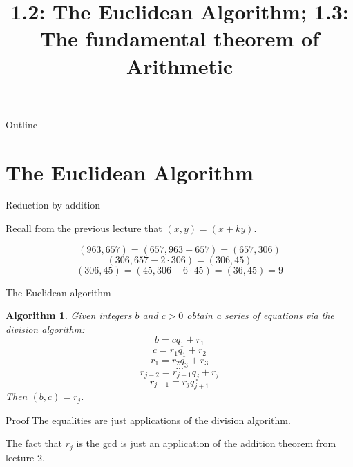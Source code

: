 \documentclass{beamer}
\title[Euclidean Algorithm] %
{1.2: The Euclidean Algorithm; 1.3: The fundamental theorem of
  Arithmetic}
\newtheorem{algorithm}[theorem]{Algorithm}
\begin{document}
\begin{frame}
  \titlepage
\end{frame}

\begin{frame}{Outline}
  \tableofcontents
\end{frame}




\section{The Euclidean Algorithm}

\begin{frame}{Reduction by addition}

  Recall from the previous lecture that $(x, y) = (x + ky)$.
  
  $$(963, 657) = (657, 963 - 657) = (657, 306)$$
  $$(306, 657 - 2 \cdot 306) = (306, 45)$$
  $$(306, 45) = (45, 306 - 6\cdot 45) = (36, 45) = 9$$

\end{frame}

\begin{frame}{The Euclidean algorithm}
  
\begin{algorithm}
  Given integers $b$ and $c > 0$ obtain a series of equations via the
  division algorithm:
  $$b = cq_1 + r_1$$
  $$c = r_1q_1 + r_2$$
  $$r_1 = r_2q_3 + r_3$$
  $$...$$
  $$r_{j - 2} = r_{j -1}q_j + r_j$$
  $$r_{j-1} = r_jq_{j+1}$$
  Then $(b, c) = r_j$.
\end{algorithm}

\end{frame}

\begin{frame}{Proof}
  The equalities are just applications of the division algorithm. 

  The fact that $r_j$ is the gcd is just an application of the
  addition theorem from lecture 2.

\end{frame}
\end{document}
